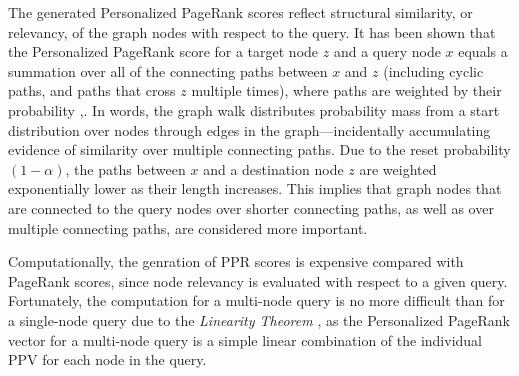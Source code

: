 \documentclass[11pt,oneside]{book}
\newcommand{\edge}[3]{{#1}\buildrel{#2}\over\longrightarrow{#3}}
\newcommand{\transition}{{\bf M}}
\begin{document}
The generated Personalized PageRank scores reflect structural
similarity, or relevancy, of the graph nodes with respect to the
query. It has been shown that the Personalized PageRank score for a
target node $z$ and a query node $x$ equals a summation over all of
the connecting paths between $x$ and $z$ (including cyclic paths, and
paths that cross $z$ multiple times), where paths are weighted by
their probability \citep{jeh2003scaling},\citep{fogaras2004towards}. In words, the graph walk
distributes probability mass from a start distribution over nodes
through edges in the graph---incidentally accumulating evidence of
similarity over multiple connecting paths. Due to the reset
probability $(1- \alpha)$, the paths between $x$ and a destination
node $z$ are weighted exponentially lower as their length
increases. This implies that graph nodes that are connected to the
query nodes over shorter connecting paths, as well as over multiple
connecting paths, are considered more important.

Computationally, the genration of PPR scores is expensive compared
with PageRank scores, since node relevancy is evaluated with respect
to a given query. Fortunately, the computation for a multi-node query
is no more difficult than for a single-node query due to the
\textit{Linearity Theorem} \citep{jeh2003scaling}, as the Personalized
PageRank vector for a multi-node query is a simple linear combination
of the individual PPV for each node in the query.

\end{document}
